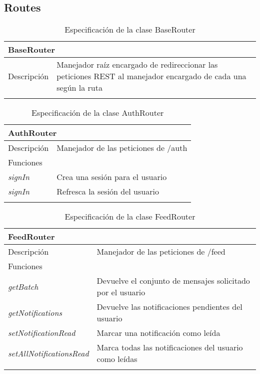 \vspace{-20pt}
\subsection{Routes}

\begin{longtable}{|p{} p{}|}
    \hline
    \multicolumn{2}{|l|}{BaseRouter} \\ \hline \hline
    Descripción      & Manejador raíz encargado de redireccionar las peticiones REST al manejador encargado de cada una según la ruta \\ \hline
    \caption{Especificación de la clase BaseRouter}
    \label{class:api:base_router}
\end{longtable}

\vspace{-20pt}
\begin{longtable}{|p{} p{}|}
    \hline
    \multicolumn{2}{|l|}{AuthRouter} \\ \hline \hline
    Descripción      & Manejador de las peticiones de /auth \\ \hline
    \multicolumn{2}{|l|}{Funciones} \\
    \emph{signIn}  & Crea una sesión para el usuario  \\ 
    \emph{signIn}  & Refresca la sesión del usuario  \\ \hline
    \caption{Especificación de la clase AuthRouter}
    \label{class:api:auth_router}
\end{longtable}

\vspace{-20pt}
\begin{longtable}{|p{} p{}|}
    \hline
    \multicolumn{2}{|l|}{FeedRouter} \\ \hline \hline
    Descripción      & Manejador de las peticiones de /feed \\ \hline
    \multicolumn{2}{|l|}{Funciones} \\
    \emph{getBatch}  & Devuelve el conjunto de mensajes solicitado por el usuario  \\ 
    \emph{getNotifications}  & Devuelve las notificaciones pendientes del usuario  \\ 
    \emph{setNotificationRead}  & Marcar una notificación como leída  \\ 
    \emph{setAllNotificationsRead}  & Marca todas las notificaciones del usuario como leídas  \\ \hline
    \caption{Especificación de la clase FeedRouter}
    \label{class:api:feed_router}
\end{longtable}

